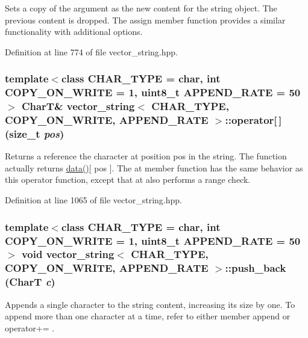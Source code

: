 Sets a copy of the argument as the new content for the string object. The previous content is dropped. The assign member function provides a similar functionality with additional options. 

Definition at line 774 of file vector\_\-string.hpp.\hypertarget{classvector__string_7f24c472b959ea7811105c6482872b6d}{
\subsubsection[{operator[]}]{\setlength{\rightskip}{0pt plus 5cm}template$<$class CHAR\_\-TYPE  = char, int COPY\_\-ON\_\-WRITE = 1, uint8\_\-t APPEND\_\-RATE = 50$>$ CharT\& {\bf vector\_\-string}$<$ CHAR\_\-TYPE, COPY\_\-ON\_\-WRITE, APPEND\_\-RATE $>$::operator\mbox{[}$\,$\mbox{]} (size\_\-t {\em pos})}}
\label{classvector__string_7f24c472b959ea7811105c6482872b6d}


Returns a reference the character at position pos in the string. The function actually returns \hyperlink{classvector__string_96e3871846c162930623048ce8e053f1}{data()}\mbox{[} pos \mbox{]}. The at member function has the same behavior as this operator function, except that at also performs a range check. 

Definition at line 1065 of file vector\_\-string.hpp.\hypertarget{classvector__string_91e53ed1638e78aecd9ec100949a46ef}{
\subsubsection[{push\_\-back}]{\setlength{\rightskip}{0pt plus 5cm}template$<$class CHAR\_\-TYPE  = char, int COPY\_\-ON\_\-WRITE = 1, uint8\_\-t APPEND\_\-RATE = 50$>$ void {\bf vector\_\-string}$<$ CHAR\_\-TYPE, COPY\_\-ON\_\-WRITE, APPEND\_\-RATE $>$::push\_\-back (CharT {\em c})}}
\label{classvector__string_91e53ed1638e78aecd9ec100949a46ef}


Appends a single character to the string content, increasing its size by one. To append more than one character at a time, refer to either member append or operator+= . 

